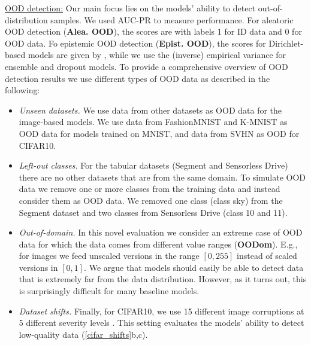 \underline{OOD detection:} Our main focus lies on the models' ability to detect out-of-distribution samples. We used AUC-PR to measure performance. For aleatoric OOD detection (\textbf{Alea. OOD}), the scores are  with labels 1 for ID data and 0 for OOD data. Fo epistemic OOD detection (\textbf{Epist. OOD}), the scores for Dirichlet-based models are given by \smash{$\alpha_0\dataix = \sum_\iclass \alpha_\iclass\dataix$}, while we use the (inverse) empirical variance  for ensemble and dropout models. To provide a comprehensive overview of OOD detection results we use different types of OOD data as described in the following: 
\begin{itemize}
    \item \textit{Unseen datasets.} We use data from other datasets as OOD data for the image-based models. We use data from FashionMNIST \cite{fashionmnist} and K-MNIST \cite{kmnist}  as OOD data for models trained on MNIST, and data from SVHN \cite{svhn} as OOD for CIFAR10.
    \item \textit{Left-out classes.} For the tabular datasets (Segment and Sensorless Drive) there are no other datasets that are from the same domain. To simulate OOD data we remove one or more classes from the training data and instead consider them as OOD data. We removed one class (class sky) from the Segment dataset and two classes from Sensorless Drive (class 10 and 11).
    \item \textit{Out-of-domain.} In this novel evaluation we consider an extreme case of OOD data for which the data comes from different value ranges (\textbf{OODom}). E.g., for images we feed unscaled versions in the range $[0, 255]$ instead of scaled versions in $[0,1]$. We argue that models should easily be able to detect data that is extremely far from the data distribution. However, as it turns out, this is surprisingly difficult for many baseline models.
    \item \textit{Dataset shifts.} Finally, for CIFAR10, we use 15 different image corruptions at 5 different severity levels \cite{benchmarking-corruptions}. This setting evaluates the models' ability to detect low-quality data (\cref{cifar_shifts}b,c). 
\end{itemize}

